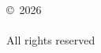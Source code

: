 \vspace*{\fill}
\newcommand{\thecopyrightdate}{2026}
\begin{center}
  \copyright\ \thecopyrightdate \\
  \theauthor \\
  All rights reserved
\end{center}
\thispagestyle{empty}